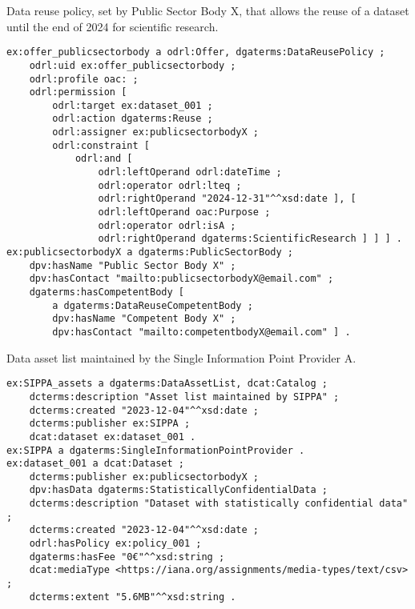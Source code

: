\begin{listing}[ht]
\caption[Public sector body data reuse policy.]{Data reuse policy, set by Public Sector Body X, that allows the reuse of a dataset until the end of 2024 for scientific research.}
\label{list:public_sector_body}
\begin{verbatim}
ex:offer_publicsectorbody a odrl:Offer, dgaterms:DataReusePolicy ;
    odrl:uid ex:offer_publicsectorbody ;
    odrl:profile oac: ;
    odrl:permission [
        odrl:target ex:dataset_001 ;
        odrl:action dgaterms:Reuse ;
        odrl:assigner ex:publicsectorbodyX ;
        odrl:constraint [
            odrl:and [
                odrl:leftOperand odrl:dateTime ;
                odrl:operator odrl:lteq ;
                odrl:rightOperand "2024-12-31"^^xsd:date ], [
                odrl:leftOperand oac:Purpose ;
                odrl:operator odrl:isA ;
                odrl:rightOperand dgaterms:ScientificResearch ] ] ] .
ex:publicsectorbodyX a dgaterms:PublicSectorBody ;
    dpv:hasName "Public Sector Body X" ;
    dpv:hasContact "mailto:publicsectorbodyX@email.com" ;
    dgaterms:hasCompetentBody [
        a dgaterms:DataReuseCompetentBody ;
        dpv:hasName "Competent Body X" ;
        dpv:hasContact "mailto:competentbodyX@email.com" ] .
\end{verbatim}
\end{listing}

\begin{listing}[ht]
\caption[Data asset list maintained by a single information point provider.]{Data asset list maintained by the Single Information Point Provider A.}
\label{list:data_asset_list}
\begin{verbatim}
ex:SIPPA_assets a dgaterms:DataAssetList, dcat:Catalog ;
    dcterms:description "Asset list maintained by SIPPA" ;
    dcterms:created "2023-12-04"^^xsd:date ;
    dcterms:publisher ex:SIPPA ;
    dcat:dataset ex:dataset_001 .
ex:SIPPA a dgaterms:SingleInformationPointProvider .
ex:dataset_001 a dcat:Dataset ;
    dcterms:publisher ex:publicsectorbodyX ;
    dpv:hasData dgaterms:StatisticallyConfidentialData ;
    dcterms:description "Dataset with statistically confidential data" ;
    dcterms:created "2023-12-04"^^xsd:date ; 
    odrl:hasPolicy ex:policy_001 ;
    dgaterms:hasFee "0€"^^xsd:string ;
    dcat:mediaType <https://iana.org/assignments/media-types/text/csv> ;
    dcterms:extent "5.6MB"^^xsd:string .
\end{verbatim}
\end{listing}

